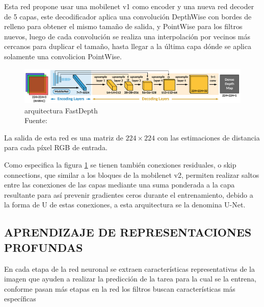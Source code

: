         	Esta red propone usar una mobilenet v1 como encoder y una nueva red decoder de 5 capas, este decodificador aplica una convolución DepthWise con bordes de relleno para obtener el mismo tamaño de salida, y PointWise para los filtros nuevos, luego de cada convolución se realiza una interpolación por vecinos más cercanos para duplicar el tamaño, hasta llegar a la última capa dónde se aplica solamente una convolicion PointWise.
        	
        	\begin{figure}[H]
        		\centering
        		\includegraphics[scale=0.11]{imagenes/fastdepth}
        		\caption[Arquitectura FastDepth]{arquitectura FastDepth\\ Fuente: \citep{icra_2019_fastdepth}}\label{fastdepth}
        	\end{figure}
        	
        	La salida de esta red es una matriz de $224\times224$ con las estimaciones de distancia para cada píxel RGB de entrada.
        	
        	Como especifica la figura \ref{fastdepth} se tienen también conexiones residuales, o skip connections, que similar a los bloques de la mobilenet v2, permiten realizar saltos entre las conexiones de las capas mediante una suma ponderada a la capa resultante para así prevenir gradientes ceros durante el entrenamiento, debido a la forma de U de estas conexiones, a esta arquitectura se la denomina U-Net.
    \subsection{APRENDIZAJE DE REPRESENTACIONES PROFUNDAS}
	    En cada etapa de la red neuronal se extraen características representativas de la imagen que ayuden a realizar la predicción de la tarea para la cual se la entrena, conforme pasan más etapas en la red los filtros buscan características más específicas \citep{Goodfellow-et-al-2016}
	    
